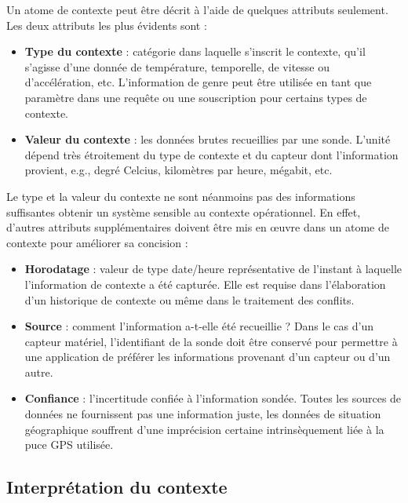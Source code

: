 Un atome de contexte peut être décrit à l'aide de quelques attributs seulement.
Les deux attributs les plus évidents sont :

\begin{itemize}
    \item \textbf{Type du contexte} :
        catégorie dans laquelle s'inscrit le contexte, qu'il s'agisse d'une
        donnée de température, temporelle, de vitesse ou d'accélération,
        etc. L'information de genre peut être utilisée en tant que paramètre
        dans une requête ou une souscription pour certains types de contexte. 
    \item \textbf{Valeur du contexte} : 
	    les données brutes recueillies par une sonde. L'unité dépend très
	    étroitement du type de contexte et du capteur dont l'information
	    provient, e.g., degré Celcius, kilomètres par heure, mégabit, etc.
\end{itemize}

Le type et la valeur du contexte ne sont néanmoins pas des informations
suffisantes obtenir un système sensible au contexte opérationnel. En effet,
d'autres attributs supplémentaires doivent être mis en œuvre dans un atome de
contexte pour améliorer sa concision :

\begin{itemize}
    \item \textbf{Horodatage} :
        valeur de type date/heure représentative de l'instant à laquelle
        l'information de contexte a été capturée. Elle est requise dans
        l'élaboration d'un historique de contexte ou même dans le traitement des
        conflits.
    \item \textbf{Source} :
        comment l'information a-t-elle été recueillie ? Dans le cas d'un
        capteur matériel, l'identifiant de la sonde doit être conservé pour
        permettre à une application de préférer les informations provenant
        d'un capteur ou d'un autre.
    \item \textbf{Confiance} :
        l'incertitude confiée à l'information sondée. Toutes les sources
        de données ne fournissent pas une information juste, les données de
        situation géographique souffrent d'une imprécision certaine
        intrinsèquement liée à la puce GPS utilisée.
\end{itemize}

\subsection{Interprétation du contexte}

